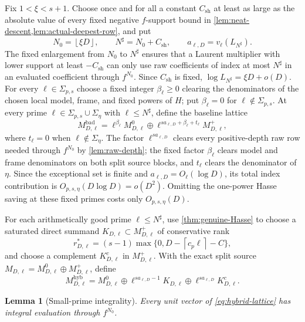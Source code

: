 \documentclass[11pt]{article}
\newtheorem{lemma}[lemma]{Lemma}
\theoremstyle{definition}
\theoremstyle{remark}
\newcommand{\floor}[1]{\left\lfloor #1\right\rfloor}
\newcommand{\ceil}[1]{\left\lceil #1\right\rceil}
\begin{document}
Fix $1<\xi<s+1$.  Choose once and for all a constant
$C_{\mathrm{sh}}$ at least as large as the absolute value of every fixed
negative $f$-support bound in \cref{lem:neat-descent,lem:actual-deepest-row},
and put
\[
 N_0=\floor{\xi D},
 \qquad
 N^\sharp=N_0+C_{\mathrm{sh}},
 \qquad
 a_{\ell,D}=v_\ell(L_{N^\sharp}).
\]
The fixed enlargement from $N_0$ to $N^\sharp$ ensures that a Laurent
multiplier with lower support at least $-C_{\mathrm{sh}}$ can only use raw
coefficients of index at most $N^\sharp$ in an evaluated coefficient through
$f^{N_0}$.  Since $C_{\mathrm{sh}}$ is fixed,
$\log L_{N^\sharp}=\xi D+o(D)$.
For every $\ell\in\Sigma_{p,s}$ choose a fixed integer
$\beta_\ell\ge0$ clearing the denominators of the chosen local model, frame,
and fixed powers of $H$; put $\beta_\ell=0$ for
$\ell\notin\Sigma_{p,s}$.  At every prime
$\ell\in\Sigma_{p,s}\cup\Sigma_\eta$ with $\ell\le N^\sharp$, define the baseline
lattice
\begin{equation}\label{eq:bad-small-lattice}
 M^{\mathrm{bad}}_{D,\ell}
 =\ell^{\beta_\ell}M^0_{D,\ell}\oplus
 \ell^{sa_{\ell,D}+\beta_\ell+t_\ell}M^+_{D,\ell},
\end{equation}
where $t_\ell=0$ when $\ell\notin\Sigma_\eta$.  The factor
$\ell^{sa_{\ell,D}}$ clears every positive-depth raw row needed through
$f^{N_0}$ by \cref{lem:raw-depth}; the fixed factor $\beta_\ell$ clears
model and frame denominators on both split source blocks, and
$t_\ell$ clears the denominator of $\eta$.  Since the exceptional set is
finite and $a_{\ell,D}=O_\ell(\log D)$, its total index contribution is
$O_{p,s,\eta}(D\log D)=o(D^2)$.  Omitting the one-power Hasse saving at these
fixed primes costs only $O_{p,s,\eta}(D)$.

For each arithmetically good prime $\ell\le N^\sharp$, use
\cref{thm:genuine-Hasse} to choose a
saturated direct summand $K_{D,\ell}\subset M^+_{D,\ell}$ of conservative
rank
\begin{equation}\label{eq:r-star}
 r^*_{D,\ell}=(s-1)
 \max\{0,D-\ceil{c_p\ell}-C\},
\end{equation}
and choose a complement $K^c_{D,\ell}$ in $M^+_{D,\ell}$.  With the exact
split source $M_{D,\ell}=M^0_{D,\ell}\oplus M^+_{D,\ell}$, define
\begin{equation}\label{eq:hybrid-lattice}
 M^{\mathrm{hyb}}_{D,\ell}
 =M^0_{D,\ell}
 \oplus \ell^{sa_{\ell,D}-1}K_{D,\ell}
 \oplus \ell^{sa_{\ell,D}}K^c_{D,\ell}.
\end{equation}

\begin{lemma}[Small-prime integrality]\label{lem:small-integrality}
Every unit vector of \eqref{eq:hybrid-lattice} has integral evaluation through
$f^{N_0}$.
\end{lemma}
\end{document}

